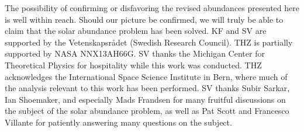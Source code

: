 \documentclass[aps,prl,twocolumn,showpacs]{revtex4}
\begin{document}
%
The possibility of confirming or disfavoring the revised abundances presented here is well within reach. Should our picture be confirmed, we will truly be able to claim that the solar abundance problem has been solved. \newline \newline \indent
%
KF and SV are supported by the Vetenskapsr\r{a}det (Swedish Research Council). THZ is partially supported by NASA NNX13AH66G. SV thanks the Michigan Center for Theoretical Physics for hospitality while this work was conducted. THZ acknowledges the International Space Science Institute in Bern, where much of the analysis relevant to this work has been performed. SV thanks Subir Sarkar, Ian Shoemaker, and especially Mads Frandsen for many fruitful discussions on the subject of the solar abundance problem, as well as Pat Scott and Francesco Villante for patiently answering many questions on the subject.


\end{document}
